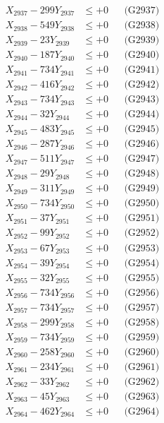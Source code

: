 \documentclass[a4paper,10pt]{article}
\begin{document}
{\begin{align}
X_{2937} - 299Y_{2937} &\leq +0 && \text{(G2937)} \\
X_{2938} - 549Y_{2938} &\leq +0 && \text{(G2938)} \\
X_{2939} - 23Y_{2939} &\leq +0 && \text{(G2939)} \\
X_{2940} - 187Y_{2940} &\leq +0 && \text{(G2940)} \\
\allowbreak
X_{2941} - 734Y_{2941} &\leq +0 && \text{(G2941)} \\
X_{2942} - 416Y_{2942} &\leq +0 && \text{(G2942)} \\
X_{2943} - 734Y_{2943} &\leq +0 && \text{(G2943)} \\
X_{2944} - 32Y_{2944} &\leq +0 && \text{(G2944)} \\
X_{2945} - 483Y_{2945} &\leq +0 && \text{(G2945)} \\
X_{2946} - 287Y_{2946} &\leq +0 && \text{(G2946)} \\
X_{2947} - 511Y_{2947} &\leq +0 && \text{(G2947)} \\
X_{2948} - 29Y_{2948} &\leq +0 && \text{(G2948)} \\
X_{2949} - 311Y_{2949} &\leq +0 && \text{(G2949)} \\
X_{2950} - 734Y_{2950} &\leq +0 && \text{(G2950)} \\
\allowbreak
X_{2951} - 37Y_{2951} &\leq +0 && \text{(G2951)} \\
X_{2952} - 99Y_{2952} &\leq +0 && \text{(G2952)} \\
X_{2953} - 67Y_{2953} &\leq +0 && \text{(G2953)} \\
X_{2954} - 39Y_{2954} &\leq +0 && \text{(G2954)} \\
X_{2955} - 32Y_{2955} &\leq +0 && \text{(G2955)} \\
X_{2956} - 734Y_{2956} &\leq +0 && \text{(G2956)} \\
X_{2957} - 734Y_{2957} &\leq +0 && \text{(G2957)} \\
X_{2958} - 299Y_{2958} &\leq +0 && \text{(G2958)} \\
X_{2959} - 734Y_{2959} &\leq +0 && \text{(G2959)} \\
X_{2960} - 258Y_{2960} &\leq +0 && \text{(G2960)} \\
\allowbreak
X_{2961} - 234Y_{2961} &\leq +0 && \text{(G2961)} \\
X_{2962} - 33Y_{2962} &\leq +0 && \text{(G2962)} \\
X_{2963} - 45Y_{2963} &\leq +0 && \text{(G2963)} \\
X_{2964} - 462Y_{2964} &\leq +0 && \text{(G2964)} \\

\end{align}}
\end{document}
